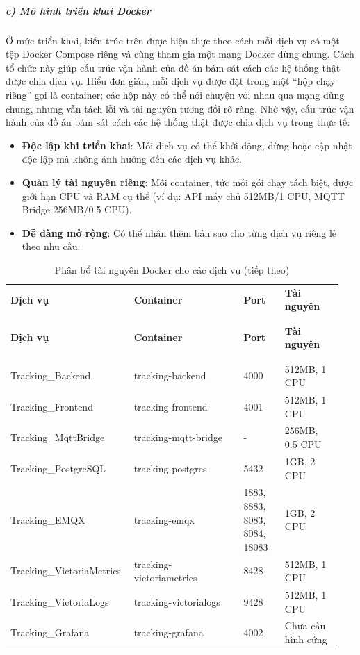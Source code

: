 \documentclass[a4paper]{extarticle}
\newcommand{\thesissettableid}[2]{%
  \renewcommand{\thetable}{#1}%
  \renewcommand{\theHtable}{#2}%
}
\providecommand{\tightlist}{%
  \setlength{\itemsep}{0pt}\setlength{\parskip}{0pt}}
\begin{document}
\subparagraph{c) Mô hình triển khai
Docker}\label{c-muxf4-huxecnh-triux1ec3n-khai-docker}

Ở mức triển khai, kiến trúc trên được hiện thực theo cách mỗi dịch vụ có
một tệp Docker Compose riêng và cùng tham gia một mạng Docker dùng chung.
Cách tổ chức này giúp cấu trúc vận hành của đồ án bám sát cách các hệ
thống thật được chia dịch vụ. Hiểu đơn giản, mỗi dịch vụ được đặt trong
một ``hộp chạy riêng'' gọi là container; các hộp này có thể nói chuyện
với nhau qua mạng dùng chung, nhưng vẫn tách lỗi và tài nguyên tương đối
rõ ràng. Nhờ vậy, cấu trúc vận hành của đồ án bám sát cách các hệ thống
thật được chia dịch vụ trong thực tế:

\begin{itemize}
\tightlist
\item
  \textbf{Độc lập khi triển khai}: Mỗi dịch vụ có thể khởi động, dừng
  hoặc cập nhật độc lập mà không ảnh hưởng đến các dịch vụ khác.
\item
  \textbf{Quản lý tài nguyên riêng}: Mỗi container, tức mỗi gói chạy tách
  biệt, được giới hạn CPU và RAM cụ thể (ví dụ: API máy chủ
  512MB/1 CPU, MQTT Bridge 256MB/0.5 CPU).
\item
  \textbf{Dễ dàng mở rộng}: Có thể nhân thêm bản sao cho từng dịch vụ riêng
  lẻ theo nhu cầu.
\end{itemize}


{\thesissettableid{3.16}{tab-ch3-phan-bo-tai-nguyen-docker-cho-cac-dich-vu}
\def\LTcaptype{table}
\begin{longtable}{|L{0.326\linewidth}|L{0.327\linewidth}|L{0.128\linewidth}|L{0.173\linewidth}|}
\caption{Phân bổ tài nguyên Docker cho các dịch vụ}\label{tab:ch3-phan-bo-tai-nguyen-docker-cho-cac-dich-vu}\\
\hline \textbf{Dịch vụ} & \textbf{Container} & \textbf{Port} & \textbf{Tài nguyên} \\
\\\hline
\endfirsthead
\caption[]{Phân bổ tài nguyên Docker cho các dịch vụ (tiếp theo)}\\
\hline \textbf{Dịch vụ} & \textbf{Container} & \textbf{Port} & \textbf{Tài nguyên} \\
\\\hline
\endhead
\\\hline
\endfoot
\endlastfoot
Tracking\_Backend & tracking-backend & 4000 & 512MB, 1 CPU \\\hline
Tracking\_Frontend & tracking-frontend & 4001 & 512MB, 1 CPU \\\hline
Tracking\_MqttBridge & tracking-mqtt-bridge & - & 256MB, 0.5 CPU \\\hline
Tracking\_PostgreSQL & tracking-postgres & 5432 & 1GB, 2 CPU \\\hline
Tracking\_EMQX & tracking-emqx & 1883, 8883, 8083, 8084, 18083 & 1GB, 2
CPU \\\hline
Tracking\_VictoriaMetrics & tracking-victoriametrics & 8428 & 512MB, 1
CPU \\\hline
Tracking\_VictoriaLogs & tracking-victorialogs & 9428 & 512MB, 1 CPU \\\hline
Tracking\_Grafana & tracking-grafana & 4002 & Chưa cấu hình cứng \\\hline
\end{longtable}
}
\end{document}
